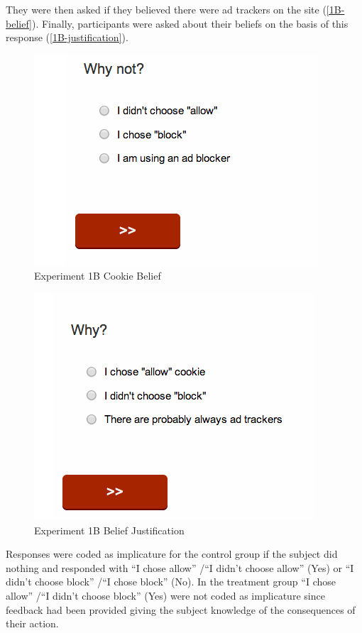 They were then asked if they believed there were ad trackers on the site  (\autoref{1B-belief}).  Finally, participants were asked about their beliefs on the basis of this response  (\autoref{1B-justification}). 

\begin{figure}
\centerline{
  \includegraphics[scale=.5]{chapter5.tex/1b-no}
  }
\caption{Experiment 1B Cookie Belief}
\label{1B-belief}
\end{figure}


\begin{figure}
\centerline{
  \includegraphics[scale=.5]{chapter5.tex/1b-yes}
  }
\caption{Experiment 1B Belief Justification}
\label{1B-justification}
\end{figure}


Responses were coded as implicature for the control group if the subject did nothing and responded with ``I chose allow'' \slash  ``I didn't choose allow'' (Yes) or ``I didn't choose block'' \slash  ``I chose block'' (No). In the treatment group ``I chose allow'' \slash  ``I didn't choose block'' (Yes) were not coded as implicature since feedback had been provided giving the subject knowledge of the consequences of their action.


